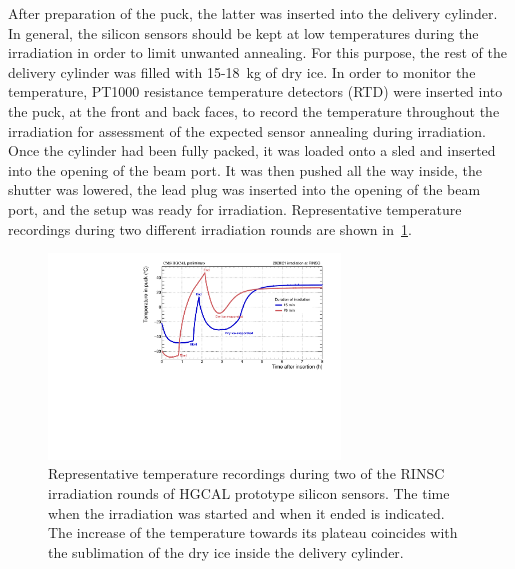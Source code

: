 After preparation of the puck, the latter was inserted into the delivery cylinder.
In general, the silicon sensors should be kept at low temperatures during the irradiation in order to limit unwanted annealing.
For this purpose, the rest of the delivery cylinder was filled with 15-\SI{18}{\kilo\gram} of dry ice.
In order to monitor the temperature, PT1000 resistance temperature detectors (RTD) were inserted into the puck, at the front and back faces, to record the temperature throughout the irradiation for assessment of the expected sensor annealing during irradiation. 
Once the cylinder had been fully packed, it was loaded onto a sled and inserted into the opening of the beam port.
It was then pushed all the way inside, the shutter was lowered, the lead plug was inserted into the opening of the beam port, and the setup was ready for irradiation.
Representative temperature recordings during two different irradiation rounds are shown in~\ref{fig:Round_10_Temperature_Profile}.
\begin{figure}[!hbt]
  \begin{center}
    \includegraphics[width=0.69\textwidth]{plots/RINSC_temp/RINSC_temp.pdf}
    \caption{Representative temperature recordings during two of the RINSC irradiation rounds of HGCAL prototype silicon sensors. 
    The time when the irradiation was started and when it ended is indicated.
    The increase of the temperature towards its plateau coincides with the sublimation of the dry ice inside the delivery cylinder.
    }
    \label{fig:Round_10_Temperature_Profile}
  \end{center}
\end{figure}
